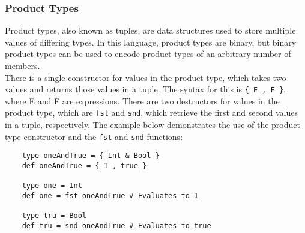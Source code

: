 \documentclass{article}
\begin{document}
\subsubsection{Product Types}
Product types, also known as tuples, are data structures used to store multiple values of differing types. In this language, product types are binary, but binary product types can be used to encode product types of an arbitrary number of members.
\\\indent There is a single constructor for values in the product type, which takes two values and returns those values in a tuple. The syntax for this is \texttt{\{ E , F \}}, where E and F are expressions. There are two destructors for values in the product type, which are \texttt{fst} and \texttt{snd}, which retrieve the first and second values in a tuple, respectively. The example below demonstrates the use of the product type constructor and the \texttt{fst} and \texttt{snd} functions:
\begin{verbatim}
    type oneAndTrue = { Int & Bool }
    def oneAndTrue = { 1 , true }

    type one = Int
    def one = fst oneAndTrue # Evaluates to 1

    type tru = Bool
    def tru = snd oneAndTrue # Evaluates to true
\end{verbatim}
\end{document}

